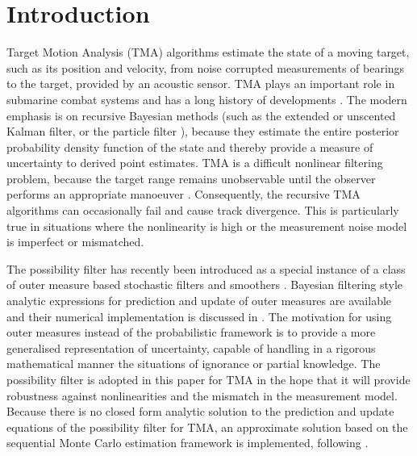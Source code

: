 \documentclass{llncs}
\begin{document}
\section{Introduction}
%
Target Motion Analysis (TMA) algorithms estimate the state of a moving target, such as its position and velocity, from noise corrupted measurements of bearings to the target, provided by an acoustic
sensor. TMA plays an important role in submarine combat systems and has a long history of developments \cite{lingren1978position,nardone1984fundamental}. The modern emphasis is on recursive Bayesian methods (such as the  extended or unscented Kalman filter, or the particle filter \cite{pfbook}),  because they estimate the  entire posterior probability density function of the state and thereby provide a measure of uncertainty to derived point estimates.  TMA is a difficult nonlinear filtering problem, because the target range remains unobservable until the observer performs an appropriate manoeuver \cite{fogel_gavish_88}. Consequently,  the recursive TMA algorithms can occasionally fail and cause track divergence. This is particularly true in situations where the nonlinearity is high or the measurement noise model is imperfect or mismatched.

The possibility filter has recently been introduced  as a special instance of a class of outer measure based stochastic filters and smoothers \cite{houssineau_bishop_17}. Bayesian filtering style analytic expressions for prediction and update of outer measures are available and their numerical implementation is discussed in \cite{houssineau_bishop_17,houssineau2017sequential,bishop2017spatial}. The motivation for using outer measures instead of the probabilistic framework is to provide a more generalised representation of uncertainty, capable of handling in a rigorous mathematical manner the situations of ignorance or partial knowledge. The possibility filter is adopted in this paper for TMA  in the hope that it will provide robustness against nonlinearities and the mismatch in the measurement model. Because there is no closed form analytic solution to  the prediction and update equations of the possibility filter for TMA,  an approximate solution based on the sequential Monte Carlo estimation framework is implemented, following \cite{houssineau2017sequential}.

\end{document}
